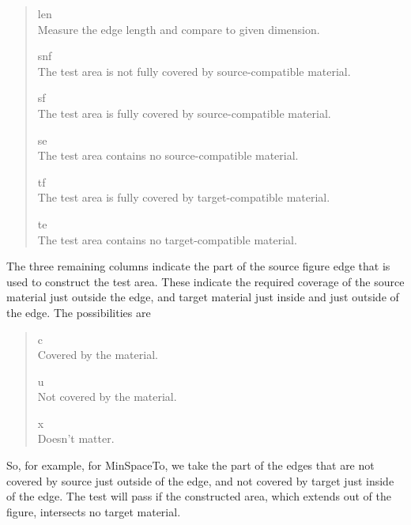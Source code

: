 \begin{quote}
\begin{description}
\item{len}\\
Measure the edge length and compare to given dimension.
\item{snf}\\
The test area is not fully covered by source-compatible material.
\item{sf}\\
The test area is fully covered by source-compatible material.
\item{se}\\
The test area contains no source-compatible material.
\item{tf}\\
The test area is fully covered by target-compatible material.
\item{te}\\
The test area contains no target-compatible material.
\end{description}
\end{quote}

The three remaining columns indicate the part of the source figure
edge that is used to construct the test area.  These indicate the
required coverage of the source material just outside the edge, and
target material just inside and just outside of the edge.  The
possibilities are

\begin{quote}
\begin{description}
\item{c}\\
Covered by the material.
\item{u}\\
Not covered by the material.
\item{x}\\
Doesn't matter.
\end{description}
\end{quote}

So, for example, for {\vt MinSpaceTo}, we take the part of the edges
that are not covered by source just outside of the edge, and not
covered by target just inside of the edge.  The test will pass if the
constructed area, which extends out of the figure, intersects no
target material.


